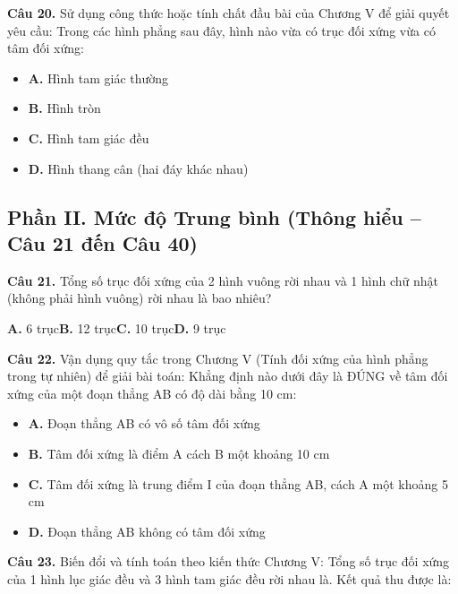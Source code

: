 \documentclass[11pt,a4paper]{article}
\begin{document}
\textbf{\color{primary} Câu 20.} Sử dụng công thức hoặc tính chất đầu bài của Chương V để giải quyết yêu cầu: Trong các hình phẳng sau đây, hình nào vừa có trục đối xứng vừa có tâm đối xứng:\par
\begin{itemize}\setlength{\itemsep}{1pt}\setlength{\parskip}{0pt}
  \item[] \textbf{A.} Hình tam giác thường
  \item[] \textbf{B.} Hình tròn
  \item[] \textbf{C.} Hình tam giác đều
  \item[] \textbf{D.} Hình thang cân (hai đáy khác nhau)
\end{itemize}\vspace{2pt}
\subsection*{\color{accent} Phần II. Mức độ Trung bình (Thông hiểu -- Câu 21 đến Câu 40)}
\textbf{\color{primary} Câu 21.} Tổng số trục đối xứng của 2 hình vuông rời nhau và 1 hình chữ nhật (không phải hình vuông) rời nhau là bao nhiêu?\par
\hspace*{1.5em}\textbf{A.} 6 trục\quad\quad \textbf{B.} 12 trục\quad\quad \textbf{C.} 10 trục\quad\quad \textbf{D.} 9 trục\par\vspace{2pt}
\textbf{\color{primary} Câu 22.} Vận dụng quy tắc trong Chương V (Tính đối xứng của hình phẳng trong tự nhiên) để giải bài toán: Khẳng định nào dưới đây là ĐÚNG về tâm đối xứng của một đoạn thẳng AB có độ dài bằng 10 cm:\par
\begin{itemize}\setlength{\itemsep}{1pt}\setlength{\parskip}{0pt}
  \item[] \textbf{A.} Đoạn thẳng AB có vô số tâm đối xứng
  \item[] \textbf{B.} Tâm đối xứng là điểm A cách B một khoảng 10 cm
  \item[] \textbf{C.} Tâm đối xứng là trung điểm I của đoạn thẳng AB, cách A một khoảng 5 cm
  \item[] \textbf{D.} Đoạn thẳng AB không có tâm đối xứng
\end{itemize}\vspace{2pt}
\textbf{\color{primary} Câu 23.} Biến đổi và tính toán theo kiến thức Chương V: Tổng số trục đối xứng của 1 hình lục giác đều và 3 hình tam giác đều rời nhau là. Kết quả thu được là:\par
\end{document}

